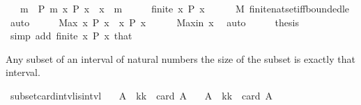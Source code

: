 \begin{isabellebody}
\ \ \ m\ \ {\isachardoublequoteopen}P\ m{\isachardoublequoteclose}\ {\isachardoublequoteopen}{\isasymAnd}x{\isachardot}{\kern0pt}\ P\ x\ {\isasymLongrightarrow}\ x\ {\isasymle}\ m{\isachardoublequoteclose}\isanewline
%
\isadelimproof
%
\endisadelimproof
%
\isatagproof
{}\isamarkupfalse%
\ {\isacharminus}{\kern0pt}\isanewline
\ \ \isamarkupfalse%
\ {\isachardoublequoteopen}finite\ {\isacharbraceleft}{\kern0pt}x{\isachardot}{\kern0pt}\ P\ x{\isacharbraceright}{\kern0pt}{\isachardoublequoteclose}\isanewline
\ \ \ \ \isamarkupfalse%
\ M\ finite{\isacharunderscore}{\kern0pt}nat{\isacharunderscore}{\kern0pt}set{\isacharunderscore}{\kern0pt}iff{\isacharunderscore}{\kern0pt}bounded{\isacharunderscore}{\kern0pt}le\ \isamarkupfalse%
\ auto\isanewline
\ \ \isamarkupfalse%
\ \isamarkupfalse%
\ {\isachardoublequoteopen}Max\ {\isacharbraceleft}{\kern0pt}x{\isachardot}{\kern0pt}\ P\ x{\isacharbraceright}{\kern0pt}\ {\isasymin}\ {\isacharbraceleft}{\kern0pt}x{\isachardot}{\kern0pt}\ P\ x{\isacharbraceright}{\kern0pt}{\isachardoublequoteclose}\isanewline
\ \ \ \ \isamarkupfalse%
\ Max{\isacharunderscore}{\kern0pt}in\ x\ \isamarkupfalse%
\ auto\isanewline
\ \ \isamarkupfalse%
\ \isamarkupfalse%
\ {\isacharquery}{\kern0pt}thesis\isanewline
\ \ \ \ \isamarkupfalse%
\ {\isacharparenleft}{\kern0pt}simp\ add{\isacharcolon}{\kern0pt}\ {\isacartoucheopen}finite\ {\isacharbraceleft}{\kern0pt}x{\isachardot}{\kern0pt}\ P\ x{\isacharbraceright}{\kern0pt}{\isacartoucheclose}\ that{\isacharparenright}{\kern0pt}\isanewline
{}\isamarkupfalse%
%
\endisatagproof
{\isafoldproof}%
%
\isadelimproof
%
\endisadelimproof
%
\begin{isamarkuptext}%
Any subset of an interval of natural numbers the size of the
subset is exactly that interval.%
\end{isamarkuptext}\isamarkuptrue%
\isamarkupfalse%
\ subset{\isacharunderscore}{\kern0pt}card{\isacharunderscore}{\kern0pt}intvl{\isacharunderscore}{\kern0pt}is{\isacharunderscore}{\kern0pt}intvl{\isacharcolon}{\kern0pt}\isanewline
\ \ \ {\isachardoublequoteopen}A\ {\isasymsubseteq}\ {\isacharbraceleft}{\kern0pt}k{\isachardot}{\kern0pt}{\isachardot}{\kern0pt}{\isacharless}{\kern0pt}k\ {\isacharplus}{\kern0pt}\ card\ A{\isacharbraceright}{\kern0pt}{\isachardoublequoteclose}\isanewline
\ \ \ {\isachardoublequoteopen}A\ {\isacharequal}{\kern0pt}\ {\isacharbraceleft}{\kern0pt}k{\isachardot}{\kern0pt}{\isachardot}{\kern0pt}{\isacharless}{\kern0pt}k\ {\isacharplus}{\kern0pt}\ card\ A{\isacharbraceright}{\kern0pt}{\isachardoublequoteclose}\isanewline

\end{isabellebody}
